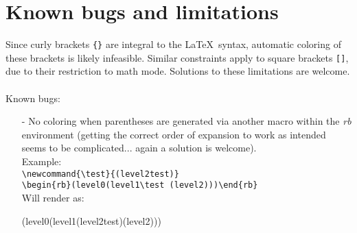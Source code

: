 \documentclass[10pt, a4paper]{article}
\begin{document}
	\section{Known bugs and limitations}
	Since curly brackets \verb={}= are integral to the \LaTeX\ syntax, automatic coloring of these brackets is likely infeasible. Similar constraints apply to square brackets \verb=[]=, due to their restriction to math mode. Solutions to these limitations are welcome.
	\\\ \\Known bugs:
	\begin{enumerate}
		\item[-] No coloring when parentheses are generated via another macro within the \textit{rb} environment (getting the correct order of expansion to work as intended seems to be complicated... again a solution is welcome). \\Example: 
		\\\verb=\newcommand{\test}{(level2test)}= 
		\\\verb=\begin{rb}(level0(level1\test (level2)))\end{rb}= 
		\\Will render as: \newcommand{\test}{(level2test)}\begin{rb}(level0(level1\test (level2)))\end{rb}  
	\end{enumerate}
\end{document}
